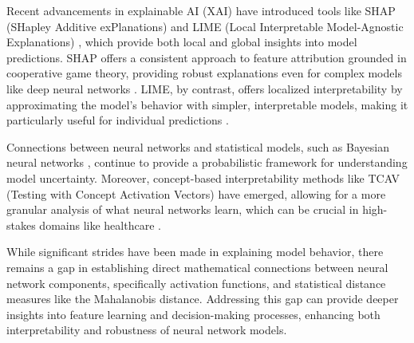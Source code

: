 Recent advancements in explainable AI (XAI) have introduced tools like SHAP (SHapley Additive exPlanations) \citep{lundberg2017unified} and LIME (Local Interpretable Model-Agnostic Explanations) \citep{ribeiro2016should}, which provide both local and global insights into model predictions. SHAP offers a consistent approach to feature attribution grounded in cooperative game theory, providing robust explanations even for complex models like deep neural networks \citep{lundberg2017unified,markov2020shap}. LIME, by contrast, offers localized interpretability by approximating the model’s behavior with simpler, interpretable models, making it particularly useful for individual predictions \citep{ribeiro2016should,ali2024explainable}.

Connections between neural networks and statistical models, such as Bayesian neural networks \citep{neal1996bayesian,blundell2015weight}, continue to provide a probabilistic framework for understanding model uncertainty. Moreover, concept-based interpretability methods like TCAV (Testing with Concept Activation Vectors) \citep{kim2018interpretability} have emerged, allowing for a more granular analysis of what neural networks learn, which can be crucial in high-stakes domains like healthcare \citep{hanif2024systematic}.

While significant strides have been made in explaining model behavior, there remains a gap in establishing direct mathematical connections between neural network components, specifically activation functions, and statistical distance measures like the Mahalanobis distance. Addressing this gap can provide deeper insights into feature learning and decision-making processes, enhancing both interpretability and robustness of neural network models.
